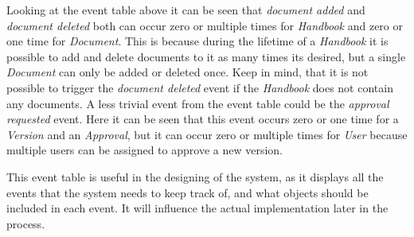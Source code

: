 Looking at the event table above it can be seen that \textit{document added} and \textit{document deleted} both can occur zero or multiple times for \textit{Handbook} and zero or one time for \textit{Document}.
This is because during the lifetime of a \textit{Handbook} it is possible to add and delete documents to it as many times its desired, but a single \textit{Document} can only be added or deleted once.
Keep in mind, that it is not possible to trigger the \textit{document deleted} event if the \textit{Handbook} does not contain any documents.
A less trivial event from the event table could be the \textit{approval requested} event.
Here it can be seen that this event occurs zero or one time for a \textit{Version} and an \textit{Approval}, but it can occur zero or multiple times for \textit{User} because multiple users can be assigned to approve a new version.

This event table is useful in the designing of the system, as it displays all the events that the system needs to keep track of, and what objects should be included in each event. It will influence the actual implementation later in the process.
